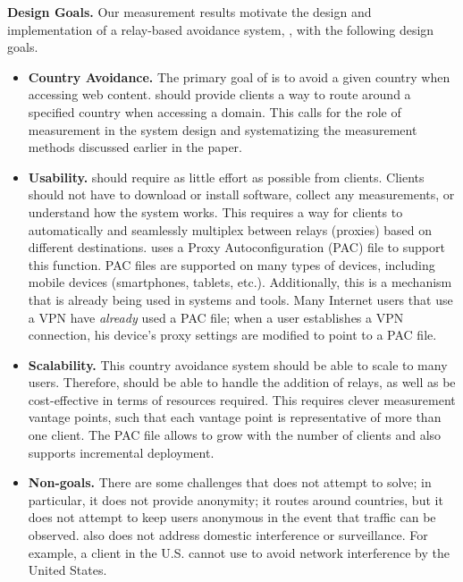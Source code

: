{\bf Design Goals.} Our measurement results motivate 
 the design and implementation of a relay-based avoidance system,
\system{}, with the following design goals.
\label{goals}
\begin{itemize}
\item {\bf Country Avoidance.}  The primary goal of \system{} is to
avoid a given country when accessing web content.  \system{} should
provide clients a way to route around a specified country when
accessing a domain.  This calls for the role of measurement in the
system design and systematizing the measurement methods discussed
earlier in the paper.

\item {\bf Usability.} \system{} should require as little effort as
possible from clients.  Clients should not have to download
or install software, collect any measurements, or understand how the
system works.  This requires a way for clients to automatically and
seamlessly multiplex between relays (proxies) based on different
destinations.  \system{} uses a Proxy Autoconfiguration (PAC) file to support this
function.  PAC files are supported on many types of devices, including mobile 
devices (smartphones, tablets, etc.).  Additionally, this is a mechanism that 
is already being used in systems and tools.  Many Internet users that 
use a VPN have {\it already} used a PAC file; when a user establishes a VPN connection, his 
device's proxy settings are modified to point to a PAC file.  

\item {\bf Scalability.}  This country avoidance system should be able to scale to 
many users.  Therefore, \system{} should be able to handle the addition
 of relays, as well as be cost-effective in terms of resources required. This requires 
clever measurement vantage points, such that each vantage point is representative of 
more than one client.  The PAC file allows \system{} to 
grow with the number of clients and also supports incremental deployment.

\item {\bf Non-goals.}  There are some challenges that \system{} does not
attempt to  solve; in particular, it does not provide anonymity; it routes
around  countries,
but it does not attempt to keep users anonymous in the event that traffic can
be observed.   \system{} also does not address domestic interference or surveillance. For
example, a client in the U.S. cannot use \system{} to avoid network interference 
by the United States. 
\end{itemize}
